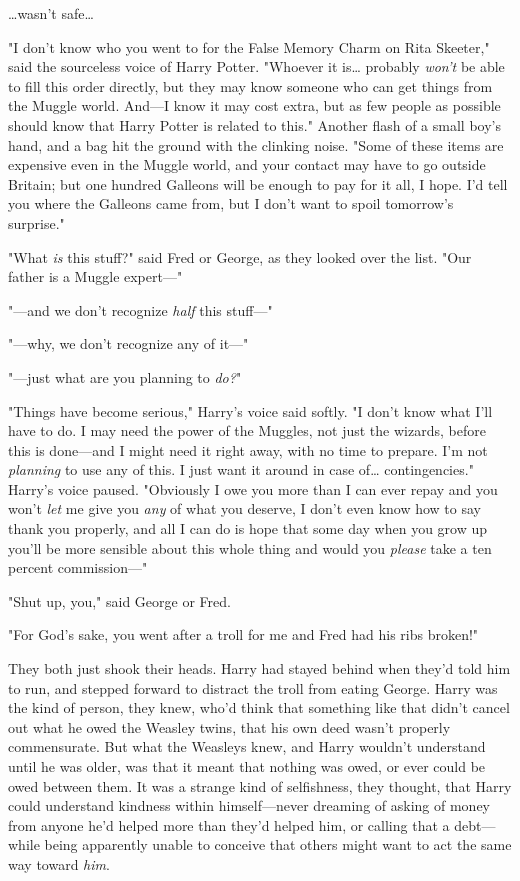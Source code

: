 {\ldots}wasn't safe{\ldots}

"I don't know who you went to for the False Memory Charm on Rita Skeeter," said
the sourceless voice of Harry Potter. "Whoever it is{\ldots} probably
\emph{won't} be able to fill this order directly, but they may know someone who
can get things from the Muggle world. And---I know it may cost extra, but as
few people as possible should know that Harry Potter is related to this."
Another flash of a small boy's hand, and a bag hit the ground with the clinking
noise. "Some of these items are expensive even in the Muggle world, and your
contact may have to go outside Britain; but one hundred Galleons will be enough
to pay for it all, I hope. I'd tell you where the Galleons came from, but I
don't want to spoil tomorrow's surprise."

"What \emph{is} this stuff?" said Fred or George, as they looked over the list.
"Our father is a Muggle expert---"

"---and we don't recognize \emph{half} this stuff---"

"---why, we don't recognize any of it---"

"---just what are you planning to \emph{do?}"

"Things have become serious," Harry's voice said softly. "I don't know what
I'll have to do. I may need the power of the Muggles, not just the wizards,
before this is done---and I might need it right away, with no time to prepare.
I'm not \emph{planning} to use any of this. I just want it around in case
of{\ldots} contingencies." Harry's voice paused. "Obviously I owe you more than
I can ever repay and you won't \emph{let} me give you \emph{any} of what you
deserve, I don't even know how to say thank you properly, and all I can do is
hope that some day when you grow up you'll be more sensible about this whole
thing and would you \emph{please} take a ten percent commission---"

"Shut up, you," said George or Fred.

"For God's sake, you went after a troll for me and Fred had his ribs broken!"

They both just shook their heads. Harry had stayed behind when they'd told him
to run, and stepped forward to distract the troll from eating George. Harry was
the kind of person, they knew, who'd think that something like that didn't
cancel out what he owed the Weasley twins, that his own deed wasn't properly
commensurate. But what the Weasleys knew, and Harry wouldn't understand until
he was older, was that it meant that nothing was owed, or ever could be owed
between them. It was a strange kind of selfishness, they thought, that Harry
could understand kindness within himself---never dreaming of asking of money
from anyone he'd helped more than they'd helped him, or calling that a
debt---while being apparently unable to conceive that others might want to act
the same way toward \emph{him}.

